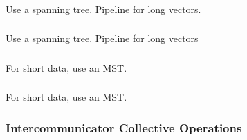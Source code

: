 \documentclass{article}
\begin{document}
\subsubsection{}
Use a spanning tree.  Pipeline for long vectors.

\subsubsection{}

\subsubsection{}
Use a spanning tree.  Pipeline for long vectors

\subsubsection{}
For short data, use an MST. 

\subsubsection{}
For short data, use an MST. 

\subsubsection{Intercommunicator Collective Operations}
\subsubsection{}
\subsubsection{}
\subsubsection{}
\subsubsection{}
\subsubsection{}
\subsubsection{}
\end{document}
